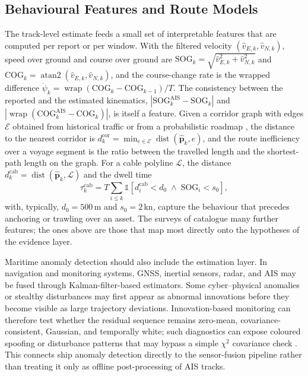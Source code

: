 \subsection{Behavioural Features and Route Models}
\label{subsec:maritime-features}
The track-level estimate feeds a small set of interpretable features that are computed per report or per window. With the filtered velocity $(\hat v_{E,k},\hat v_{N,k})$, speed over ground and course over ground are $\mathrm{SOG}_k=\sqrt{\hat v_{E,k}^{2}+\hat v_{N,k}^{2}}$ and $\mathrm{COG}_k=\operatorname{atan2}(\hat v_{E,k},\hat v_{N,k})$, and the course-change rate is the wrapped difference $\dot\psi_k=\operatorname{wrap}(\mathrm{COG}_k-\mathrm{COG}_{k-1})/T$. The consistency between the reported and the estimated kinematics, $|\mathrm{SOG}^{\mathrm{AIS}}_k-\mathrm{SOG}_k|$ and $|\operatorname{wrap}(\mathrm{COG}^{\mathrm{AIS}}_k-\mathrm{COG}_k)|$, is itself a feature. Given a corridor graph with edges $\mathcal{E}$ obtained from historical traffic or from a probabilistic roadmap \cite{pallotta_tread_2013,oliva_tomei_prm_access_2026}, the distance to the nearest corridor is $d^{\mathrm{cor}}_k=\min_{e\in\mathcal{E}}\operatorname{dist}(\hat{\mathbf{p}}_k,e)$, and the route inefficiency over a voyage segment is the ratio between the travelled length and the shortest-path length on the graph. For a cable polyline $\mathcal{L}$, the distance $d^{\mathrm{cab}}_k=\operatorname{dist}(\hat{\mathbf{p}}_k,\mathcal{L})$ and the dwell time
\begin{equation}
\tau^{\mathrm{cab}}_k=T\sum_{i\le k}\mathbb{1}\!\left[d^{\mathrm{cab}}_i<d_0\;\wedge\;\mathrm{SOG}_i<s_0\right],
\label{eq:ch07-dwell}
\end{equation}
with, typically, $d_0=500$\,m and $s_0=2$\,kn, capture the behaviour that precedes anchoring or trawling over an asset. The surveys of \cite{riveiro_review_2018,wolsing_anomaly_2022} catalogue many further features; the ones above are those that map most directly onto the hypotheses of the evidence layer.


Maritime anomaly detection should also include the estimation layer. In navigation and monitoring systems, GNSS, inertial sensors, radar, and AIS may be fused through Kalman-filter-based estimators. Some cyber--physical anomalies or stealthy disturbances may first appear as abnormal innovations before they become visible as large trajectory deviations. Innovation-based monitoring can therefore test whether the residual sequence remains zero-mean, covariance-consistent, Gaussian, and temporally white; such diagnostics can expose coloured spoofing or disturbance patterns that may bypass a simple \(\chi^2\) covariance check \cite{oliva_innovation_2026}. This connects ship anomaly detection directly to the sensor-fusion pipeline rather than treating it only as offline post-processing of AIS tracks.

